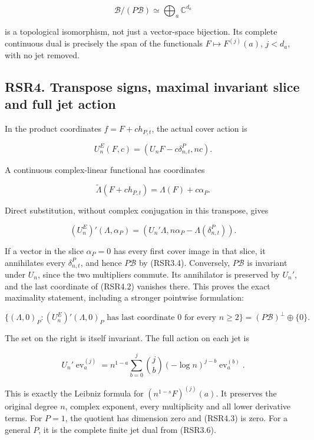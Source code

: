 \[
\mathcal B/(P\mathcal B)\simeq\bigoplus_a\mathbb C^{d_a}
\tag{RSR3.6}
\]

is a topological isomorphism, not just a vector-space bijection. Its
complete continuous dual is precisely the span of the functionals
\(F\mapsto F^{(j)}(a)\), \(j<d_a\), with no jet removed.

\subsection{RSR4. Transpose signs, maximal invariant slice and full jet
action}\label{rsr4.-transpose-signs-maximal-invariant-slice-and-full-jet-action}

In the product coordinates \(f=F+ch_{P,t}\), the actual cover action is

\[
U_n^E(F,c)=(U_nF-c\delta^P_{n,t},nc).
\tag{RSR4.1}
\]

A continuous complex-linear functional has coordinates

\[
\widetilde\Lambda(F+ch_{P,t})=\Lambda(F)+c\alpha_P.
\]

Direct substitution, without complex conjugation in this transpose,
gives

\[
(U_n^E)'(\Lambda,\alpha_P)
=(U_n'\Lambda,n\alpha_P-\Lambda(\delta^P_{n,t})).
\tag{RSR4.2}
\]

If a vector in the slice \(\alpha_P=0\) has every first cover image in
that slice, it annihilates every \(\delta^P_{n,t}\), and hence
\(P\mathcal B\) by (RSR3.4). Conversely, \(P\mathcal B\) is invariant
under \(U_n\), since the two multipliers commute. Its annihilator is
preserved by \(U_n'\), and the last coordinate of (RSR4.2) vanishes
there. This proves the exact maximality statement, including a stronger
pointwise formulation:

\[
\boxed{\{(\Lambda,0)_P:(U_n^E)'(\Lambda,0)_P
\text{ has last coordinate }0\text{ for every }n\ge2\}
=(P\mathcal B)^\perp\oplus\{0\}.}
\tag{RSR4.3}
\]

The set on the right is itself invariant. The full action on each jet is

\[
U_n'\operatorname{ev}_a^{(j)}
=n^{1-a}\sum_{b=0}^j\binom jb(-\log n)^{j-b}
\operatorname{ev}_a^{(b)}.
\tag{RSR4.4}
\]

This is exactly the Leibniz formula for \((n^{1-s}F)^{(j)}(a)\). It
preserves the original degree \(n\), complex exponent, every
multiplicity and all lower derivative terms. For \(P=1\), the quotient
has dimension zero and (RSR4.3) is zero. For a general \(P\), it is the
complete finite jet dual from (RSR3.6).

